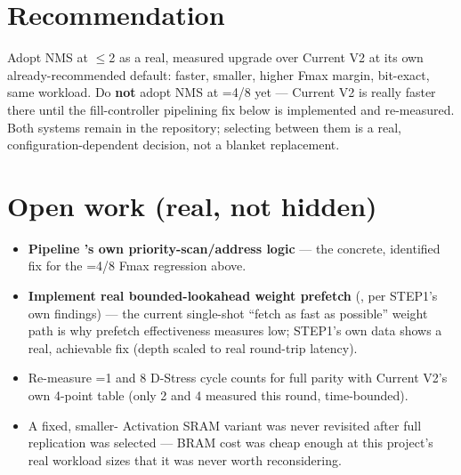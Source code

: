\section{Recommendation}
Adopt NMS at $\le$2 as a real, measured upgrade over
Current V2 at its own already-recommended default: faster, smaller,
higher Fmax margin, bit-exact, same workload. Do \textbf{not} adopt
NMS at =4/8 yet --- Current V2 is really faster there
until the fill-controller pipelining fix below is implemented and
re-measured. Both systems remain in the repository; selecting between
them is a real, configuration-dependent decision, not a blanket
replacement.

\section{Open work (real, not hidden)}
\label{sec:nmsfuture}
\begin{itemize}
\item \textbf{Pipeline 's own
      priority-scan/address logic} --- the concrete, identified fix
      for the =4/8 Fmax regression above.
\item \textbf{Implement real bounded-lookahead weight prefetch}
      (, per STEP1's own findings) --- the
      current single-shot ``fetch as fast as possible'' weight path is
      why prefetch effectiveness measures low; STEP1's own data shows
      a real, achievable fix (depth scaled to real round-trip latency).
\item Re-measure =1 and 8 D-Stress cycle counts for
      full parity with Current V2's own 4-point table (only 2 and 4
      measured this round, time-bounded).
\item A fixed, smaller- Activation SRAM variant was
      never revisited after full replication was selected --- BRAM
      cost was cheap enough at this project's real workload sizes that
      it was never worth reconsidering.
\end{itemize}
